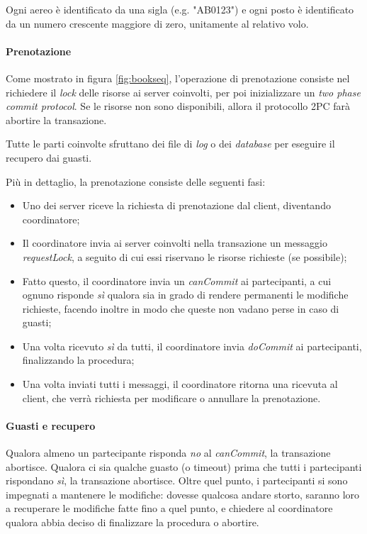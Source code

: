 \documentclass[a4paper]{article}
\begin{document}
Ogni aereo è identificato da una sigla (e.g. "AB0123") e ogni posto è identificato da un numero crescente maggiore di zero, unitamente al relativo volo.

\paragraph{Prenotazione}Come mostrato in figura \ref{fig:bookseq}, l'operazione di prenotazione consiste nel richiedere il \textit{lock} delle risorse ai server coinvolti, per poi inizializzare un \textit{two phase commit protocol}.
Se le risorse non sono disponibili, allora il protocollo 2PC farà abortire la transazione.

Tutte le parti coinvolte sfruttano dei file di \textit{log} o dei \textit{database} per eseguire il recupero dai guasti.

Più in dettaglio, la prenotazione consiste delle seguenti fasi:
\begin{itemize}
	\item Uno dei server riceve la richiesta di prenotazione dal client, diventando coordinatore;
	\item Il coordinatore invia ai server coinvolti nella transazione un messaggio \textit{requestLock}, a seguito di cui essi riservano le risorse richieste (se possibile);
	\item Fatto questo, il coordinatore invia un \textit{canCommit} ai partecipanti, a cui ognuno risponde \textit{sì} qualora sia in grado di rendere permanenti le modifiche richieste, facendo inoltre in modo che queste non vadano perse in caso di guasti;
	\item Una volta ricevuto \textit{sì} da tutti, il coordinatore invia \textit{doCommit} ai partecipanti, finalizzando la procedura;
	\item Una volta inviati tutti i messaggi, il coordinatore ritorna una ricevuta al client, che verrà richiesta per modificare o annullare la prenotazione.
\end{itemize}

\paragraph{Guasti e recupero} Qualora almeno un partecipante risponda \textit{no} al \textit{canCommit}, la transazione abortisce. Qualora ci sia qualche guasto (o timeout) prima che tutti i partecipanti rispondano \textit{sì}, la transazione abortisce. Oltre quel punto, i partecipanti si sono impegnati a mantenere le modifiche: dovesse qualcosa andare storto, saranno loro a recuperare le modifiche fatte fino a quel punto, e chiedere al coordinatore qualora abbia deciso di finalizzare la procedura o abortire.
\end{document}
